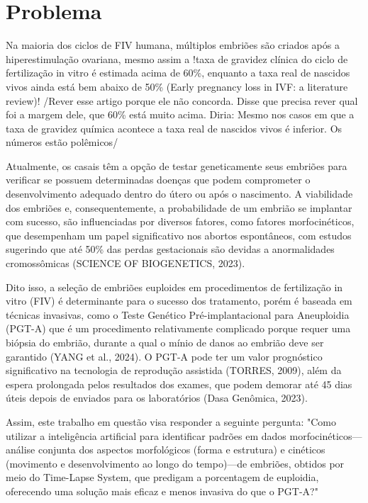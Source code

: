 \section{Problema}

Na maioria dos ciclos de FIV humana, múltiplos embriões são criados após a hiperestimulação ovariana, mesmo assim a !taxa de gravidez clínica do ciclo de fertilização in vitro é estimada acima de 60\%, enquanto a taxa real de nascidos vivos ainda está bem abaixo de 50\% (Early pregnancy loss in IVF: a literature review)! /Rever esse artigo porque ele não concorda. Disse que precisa rever qual foi a margem dele, que 60\% está muito acima. Diria: Mesmo nos casos em que a taxa de gravidez química acontece a taxa real de nascidos vivos é inferior. Os números estão polêmicos/

Atualmente, os casais têm a opção de testar geneticamente seus embriões para verificar se possuem determinadas doenças que podem comprometer o desenvolvimento adequado dentro do útero ou após o nascimento. A viabilidade dos embriões e, consequentemente, a probabilidade de um embrião se implantar com sucesso, são influenciadas por diversos fatores, como fatores morfocinéticos, que desempenham um papel significativo nos abortos espontâneos, com estudos sugerindo que até 50\% das perdas gestacionais são devidas a anormalidades cromossômicas (SCIENCE OF BIOGENETICS, 2023). 

Dito isso, a seleção de embriões euploides em procedimentos de fertilização in vitro (FIV) é determinante para o sucesso dos tratamento, porém é baseada em técnicas invasivas, como o Teste Genético Pré-implantacional para Aneuploidia (PGT-A) que é um procedimento relativamente complicado porque requer uma biópsia do embrião, durante a qual o mínio de danos ao embrião deve ser garantido (YANG et al., 2024). O PGT-A pode ter um valor prognóstico significativo na tecnologia de reprodução assistida (TORRES, 2009), além da espera prolongada pelos resultados dos exames, que podem demorar até 45 dias úteis depois de enviados para os laboratórios (Dasa Genômica, 2023).

Assim, este trabalho em questão visa responder a seguinte pergunta: "Como utilizar a inteligência artificial para identificar padrões em dados morfocinéticos—análise conjunta dos aspectos morfológicos (forma e estrutura) e cinéticos (movimento e desenvolvimento ao longo do tempo)—de embriões, obtidos por meio do Time-Lapse System, que predigam a porcentagem de euploidia, oferecendo uma solução mais eficaz e menos invasiva do que o PGT-A?"


